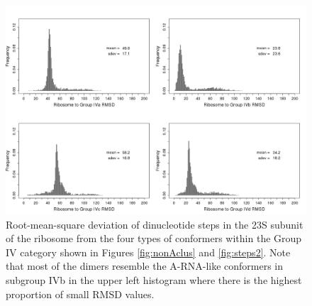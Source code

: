 \begin{figure}[htbp]
 \centering
\includegraphics[angle=90, scale=0.5]{Chapter2/RMSDschneider2.png}
\caption{Root-mean-square deviation  of dinucleotide steps  in the 23S
  subunit of the ribosome from the four types of conformers within the
  Group   IV  category   shown  in   Figures   \ref{fig:nonAclus}  and
  \ref{fig:steps2}.  Note  that  most   of  the  dimers  resemble  the
  A-RNA-like conformers  in subgroup IVb  in the upper  left histogram
  where there is the highest proportion of small RMSD values.}
 \label{fig:histo2}
\end{figure}

